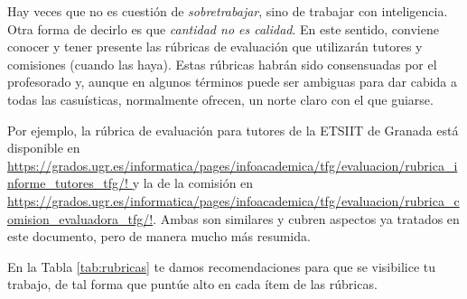 {Hay veces que no es cuestión de \textit{sobretrabajar}, sino de trabajar con inteligencia. Otra forma de decirlo es que {\it cantidad no es calidad}. En este sentido, conviene conocer y tener presente las rúbricas de evaluación que utilizarán tutores y comisiones (cuando las haya). Estas rúbricas habrán sido consensuadas por el profesorado y, aunque en algunos términos puede ser ambiguas para dar cabida a todas las casuísticas, normalmente ofrecen, un norte claro con el que guiarse.  

Por ejemplo, la rúbrica de evaluación para tutores de la ETSIIT de Granada está disponible en \url{https://grados.ugr.es/informatica/pages/infoacademica/tfg/evaluacion/rubrica_informe_tutores_tfg/! } y la de la comisión en \url{https://grados.ugr.es/informatica/pages/infoacademica/tfg/evaluacion/rubrica_comision_evaluadora_tfg/!}. Ambas son similares y cubren aspectos ya tratados en este documento, pero de manera mucho más resumida.

En la Tabla \ref{tab:rubricas} te damos recomendaciones para que se visibilice tu trabajo, de tal forma que puntúe alto en cada ítem de las rúbricas.

\begin{table}
    \centering
{}
\end{table}}
